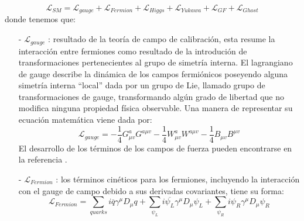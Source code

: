 \begin{equation}
\mathcal{L}_{SM} = \mathcal{L}_{gauge} + \mathcal{L}_{Fermion} + \mathcal{L}_{Higgs} + \mathcal{L}_{Yukawa} + \mathcal{L}_{GF} + \mathcal{L}_{Ghost} 
\end{equation}
donde tenemos que:
\begin{itemize}
\item[-] $\mathcal{L}_{gauge}$ : resultado de la teoría de campo de calibración, esta resume la interacción entre fermiones como resultado de la introdución de transformaciones pertenecientes al grupo de simetría interna. %
El lagrangiano de gauge describe la dinámica de los campos fermiónicos poseyendo alguna simetría interna ``local'' dada por un grupo de Lie, llamado grupo de transformaciones de gauge, transformando algún grado de libertad que no modifica ninguna propiedad física observable. %
Una manera de representar su ecuación matemática viene dada por:
\begin{equation}
\mathcal{L}_{gauge} = 
-\dfrac{1}{4}G_{\mu v}^{a} G^{a\mu v} 
-\dfrac{1}{4}W_{\mu v}^{a} W^{a\mu v} 
-\dfrac{1}{4}B_{\mu v} B^{\mu v}
\end{equation}
El desarrollo de los términos de los campos de fuerza pueden encontrarse en la referencia \citep{romao_resource_2012}.
\item[-] $\mathcal{L}_{Fermion}$ : los términos cinéticos para los fermiones, incluyendo la interacción con el gauge de campo debido a sus derivadas covariantes, tiene su forma:
\begin{equation}
\mathcal{L}_{Fermion} = 
\sum_{quarks} i \overline{q} \gamma^\mu D_\mu q +
\sum_{\psi_L} i \overline{\psi_L} \gamma^\mu D_\mu \psi_L +
\sum_{\psi_R} i \psi_R \gamma^\mu D_\mu \psi_R
\end{equation}


\end{itemize}
